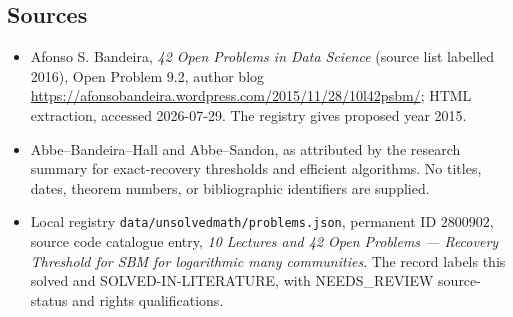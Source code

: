 \documentclass[11pt]{article}
\begin{document}
\subsection{Sources}
\begin{itemize}
\item Afonso S. Bandeira, \emph{42 Open Problems in Data Science} (source list labelled 2016), Open Problem 9.2, author blog \url{https://afonsobandeira.wordpress.com/2015/11/28/10l42psbm/}; HTML extraction, accessed 2026-07-29. The registry gives proposed year 2015.
\item Abbe--Bandeira--Hall and Abbe--Sandon, as attributed by the research summary for exact-recovery thresholds and efficient algorithms. No titles, dates, theorem numbers, or bibliographic identifiers are supplied.
\item Local registry \texttt{data/unsolvedmath/problems.json}, permanent ID $2800902$, source code catalogue entry, \emph{10 Lectures and 42 Open Problems --- Recovery Threshold for SBM for logarithmic many communities}. The record labels this solved and SOLVED-IN-LITERATURE, with NEEDS\_REVIEW source-status and rights qualifications.
\end{itemize}
\end{document}
